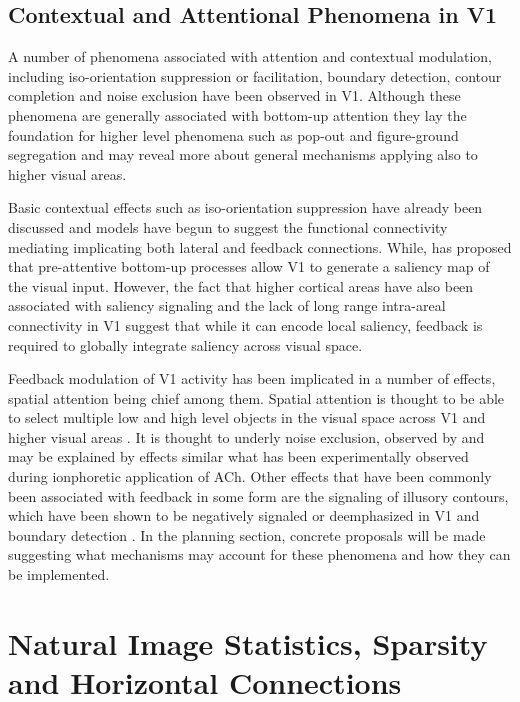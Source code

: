 \subsection{Contextual and Attentional Phenomena in V1}

A number of phenomena associated with attention and contextual
modulation, including iso-orientation suppression or facilitation,
boundary detection, contour completion and noise exclusion have been
observed in V1. Although these phenomena are generally associated with
bottom-up attention they lay the foundation for higher level phenomena
such as pop-out and figure-ground segregation and may reveal more
about general mechanisms applying also to higher visual areas.

Basic contextual effects such as iso-orientation suppression have
already been discussed and models have begun to suggest the functional
connectivity mediating implicating both lateral and feedback
connections. While, \cite{Li2002} has proposed that pre-attentive
bottom-up processes allow V1 to generate a saliency map of the visual
input. However, the fact that higher cortical areas have also been
associated with saliency signaling and the lack of long range
intra-areal connectivity in V1 suggest that while it can encode local
saliency, feedback is required to globally integrate saliency across
visual space.

Feedback modulation of V1 activity has been implicated in a number of
effects, spatial attention being chief among them. Spatial attention
is thought to be able to select multiple low and high level objects in
the visual space across V1 and higher visual areas
\citep{McMains2004}. It is thought to underly noise exclusion,
observed by \cite{Dosher2000} and may be explained by effects similar
what has been experimentally observed during ionphoretic application
of ACh. Other effects that have been commonly been associated with
feedback in some form are the signaling of illusory contours, which
have been shown to be negatively signaled or deemphasized in V1
\citep{Ramsden2001} and boundary detection \citep{Poort2012}.  In the
planning section, concrete proposals will be made suggesting what
mechanisms may account for these phenomena and how they can be
implemented.

\section{Natural Image Statistics, Sparsity and Horizontal Connections}

